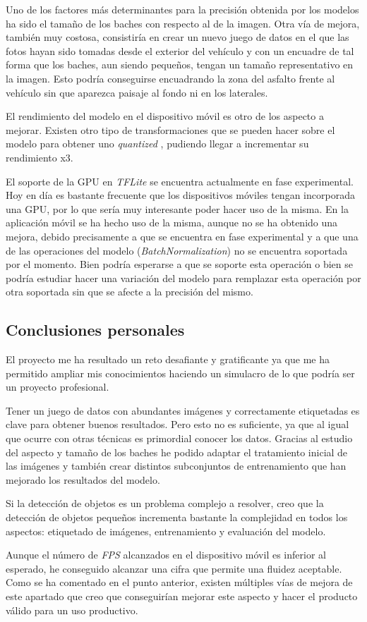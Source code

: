 Uno de los factores más determinantes para la precisión obtenida por los modelos ha sido el tamaño de los baches con respecto al de la imagen. Otra vía de mejora, también muy costosa, consistiría en crear un nuevo juego de datos en el que las fotos hayan sido tomadas desde el exterior del vehículo y con un encuadre de tal forma que los baches, aun siendo pequeños, tengan un tamaño representativo en la imagen. Esto podría conseguirse encuadrando la zona del asfalto frente al vehículo sin que aparezca paisaje al fondo ni en los laterales.

El rendimiento del modelo en el dispositivo móvil es otro de los aspecto a mejorar. Existen otro tipo de transformaciones que se pueden hacer sobre el modelo para obtener uno \textit{quantized} \cite{s8_quantizedmodel}, pudiendo llegar a incrementar su rendimiento x3.

El soporte de la GPU en \textit{TFLite} se encuentra actualmente en fase experimental. Hoy en día es bastante frecuente que los dispositivos móviles tengan incorporada una GPU, por lo que sería muy interesante poder hacer uso de la misma. En la aplicación móvil se ha hecho uso de la misma, aunque no se ha obtenido una mejora, debido precisamente a que se encuentra en fase experimental y a que una de las operaciones del modelo (\textit{BatchNormalization}) \cite{s8_batchnormalization} no se encuentra soportada por el momento. Bien podría esperarse a que se soporte esta operación o bien se podría estudiar hacer una variación del modelo para remplazar esta operación por otra soportada sin que se afecte a la precisión del mismo.

\subsection{Conclusiones personales}

El proyecto me ha resultado un reto desafiante y gratificante ya que me ha permitido ampliar mis conocimientos haciendo un simulacro de lo que podría ser un proyecto profesional.

Tener un juego de datos con abundantes imágenes y correctamente etiquetadas es clave para obtener buenos resultados. Pero esto no es suficiente, ya que al igual que ocurre con otras técnicas es primordial conocer los datos. Gracias al estudio del aspecto y tamaño de los baches he podido adaptar el tratamiento inicial de las imágenes y también crear distintos subconjuntos de entrenamiento que han mejorado los resultados del modelo.

Si la detección de objetos es un problema complejo a resolver, creo que la detección de objetos pequeños incrementa bastante la complejidad en todos los aspectos: etiquetado de imágenes, entrenamiento y evaluación del modelo.

Aunque el número de \textit{FPS} alcanzados en el dispositivo móvil es inferior al esperado, he conseguido alcanzar una cifra que permite una fluidez aceptable. Como se ha comentado en el punto anterior, existen múltiples vías de mejora de este apartado que creo que conseguirían mejorar este aspecto y hacer el producto válido para un uso productivo.